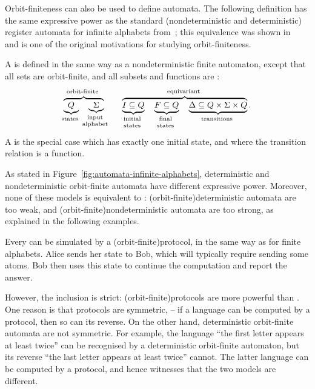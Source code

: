 Orbit-finiteness can also be used to define automata. The following definition
has the same expressive power as the standard (nondeterministic and
deterministic) register automata for infinite alphabets
from~\cite{kaminskiFiniteMemoryAutomata1994}; this equivalence was shown
in~\cite[Lemma 6.3]{bojanczykAutomataTheoryNominal2014} and is one of the
original motivations for studying orbit-finiteness.

\begin{definition}
    \label{def:orbit-finite-automata}
    \AP
    A  is defined in the same way as a 
    nondeterministic finite automaton, except that all sets are orbit-finite, 
    and all subsets and functions are :
\begin{align*}
    \myoverbrace{
        \myunderbrace{Q}{states} \quad 
        \myunderbrace{\Sigma}{input \\ alphabet}
    }
    {orbit-finite}
    \qquad
    \myoverbrace{
        \myunderbrace{I \subseteq Q}{initial \\ states} \quad 
        \myunderbrace{F \subseteq Q}{final \\ states} \quad 
        \myunderbrace{\Delta \subseteq Q \times \Sigma \times Q}{transitions}
    }{equivariant}.
\end{align*}
A 
is the special case which has exactly one initial state, and where the transition relation is a function.
\end{definition}

As stated in Figure~\ref{fig:automata-infinite-alphabets}, deterministic and
nondeterministic orbit-finite automata have different expressive power.
Moreover, none of these models is equivalent to :
\kl(orbit-finite){deterministic automata} are too weak, and 
\kl(orbit-finite){nondeterministic automata} are too
strong, as explained in the following examples.

\begin{myexample}
    \label{ex:protocol-not-dofa}
  Every  can be simulated by a 
  \kl(orbit-finite){protocol},
  in the same way as for finite alphabets. Alice sends her state to Bob,
  which will typically require sending some atoms. Bob then uses this state
  to continue the computation and report the answer. 
    
  However, the inclusion is strict: \kl(orbit-finite){protocols} are more powerful than
  . One reason is that protocols are
  symmetric, -- if a language can be computed by a protocol, then so can its
  reverse. On the other hand, deterministic orbit-finite automata are not
  symmetric. For example, the language ``the first letter appears at least
  twice'' can be recognised by a deterministic orbit-finite automaton, but
  its reverse ``the last letter appears at least twice'' cannot. The latter
  language can be computed by a protocol, and hence witnesses that the two
  models are different. 
\end{myexample}

